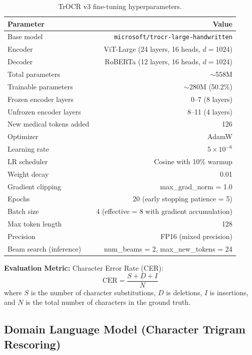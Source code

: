 \documentclass[12pt,a4paper,oneside]{report}
\begin{document}
\begin{table}[H]
\centering
\caption{TrOCR v3 fine-tuning hyperparameters.}
\label{tab:trocr_hyperparams}
\begin{tabular}{l r}
\toprule
\textbf{Parameter} & \textbf{Value} \\
\midrule
Base model & \texttt{microsoft/trocr-large-handwritten} \\
Encoder & ViT-Large (24 layers, 16 heads, $d=1024$) \\
Decoder & RoBERTa (12 layers, 16 heads, $d=1024$) \\
Total parameters & $\sim$558M \\
Trainable parameters & $\sim$280M (50.2\%) \\
Frozen encoder layers & 0--7 (8 layers) \\
Unfrozen encoder layers & 8--11 (4 layers) \\
New medical tokens added & 126 \\
Optimizer & AdamW \\
Learning rate & $5 \times 10^{-6}$ \\
LR scheduler & Cosine with 10\% warmup \\
Weight decay & 0.01 \\
Gradient clipping & max\_grad\_norm = 1.0 \\
Epochs & 20 (early stopping patience = 5) \\
Batch size & 4 (effective = 8 with gradient accumulation) \\
Max token length & 128 \\
Precision & FP16 (mixed precision) \\
Beam search (inference) & num\_beams = 2, max\_new\_tokens = 24 \\
\bottomrule
\end{tabular}
\end{table}

\textbf{Evaluation Metric:} Character Error Rate (CER):
\begin{equation}
\text{CER} = \frac{S + D + I}{N}
\end{equation}
where $S$ is the number of character substitutions, $D$ is deletions, $I$ is insertions, and $N$ is the total number of characters in the ground truth.

\subsection{Domain Language Model (Character Trigram Rescoring)}
\end{document}

